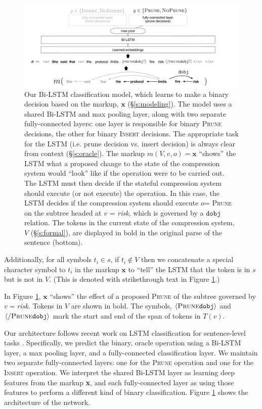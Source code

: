 \documentclass[11pt,a4paper]{article}
\begin{document}
\begin{figure}[htb!]
\centering
\includegraphics[width=.85\textwidth]{example.pdf}
\caption{Our Bi-LSTM classification model, which learns to make a binary decision based on the markup, $\bm{x}$ (\S\ref{s:modeling}). The model uses a shared Bi-LSTM and max pooling layer, along with two separate fully-connected layers: one layer is responsible for binary \textsc{Prune} decisions, the other for binary \textsc{Insert} decisions. The appropriate task for the LSTM (i.e. prune decision vs. insert decision) is always clear from context (\S\ref{s:oracle}). The markup $m(V,v,o)=\bm{x}$ ``shows'' the LSTM what a proposed change to the state of the compression system would ``look'' like if the operation were to be carried out.  The LSTM must then decide if the stateful compression system should execute (or not execute) the operation. In this case, the LSTM decides if the compression system should execute $o$= \textsc{Prune} on the subtree headed at $v$ = \textit{risk}, which is governed by a $\texttt{dobj}$ relation. The tokens in the current state of the compression system, $V$ (\S\ref{s:formal}), are displayed in bold in the original parse of the sentence (bottom).}
\label{f:example}
\end{figure}

Additionally, for all symbols $t_i \in s$, if $t_i \notin V$ then we concatenate a special character symbol to $t_i$ in the markup $\bm{x}$ to ``tell'' the LSTM that the token is in $s$ but is not in $V$. (This is denoted with strikethrough text in Figure \ref{f:example}.)

In Figure \ref{f:example}, $\bm{x}$ ``shows'' the  effect of a proposed \textsc{Prune} of the subtree governed by $v=$\textit{risk}. Tokens in $V$ are shown in bold. The symbols, $\langle \textsc{Prune} \texttt{dobj} \rangle$  and $\langle / \textsc{Prune} \texttt{dobj} \rangle$ mark the start and end of the span of tokens in $T(v)$. 

Our architecture follows recent work on LSTM classification for sentence-level tasks \cite{D17-1070}. Specifically, we predict the binary, oracle operation using a Bi-LSTM layer, a max pooling layer, and a fully-connected classification layer. We maintain two separate fully-connected layers: one for the \textsc{Prune} operation and one for the \textsc{Insert} operation. We interpret the shared Bi-LSTM layer as learning deep features from the markup \textbf{x}, and each fully-connected layer as using those features to perform a different kind of binary classification. Figure \ref{f:example} shows the architecture of the network. 
\end{document}
